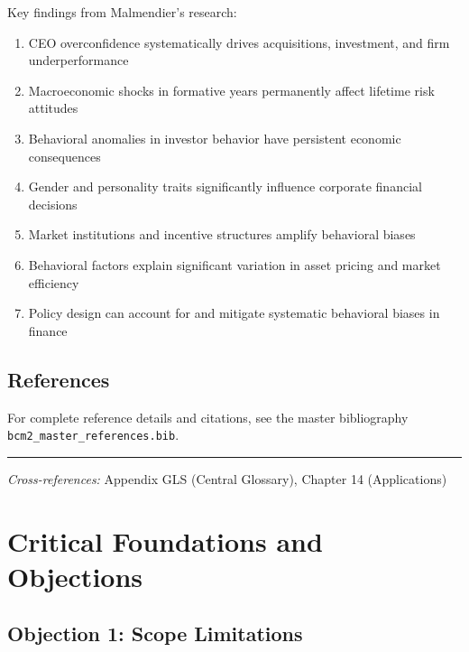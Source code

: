 Key findings from Malmendier's research:

\begin{enumerate}
  \item CEO overconfidence systematically drives acquisitions, investment, and firm underperformance
  \item Macroeconomic shocks in formative years permanently affect lifetime risk attitudes
  \item Behavioral anomalies in investor behavior have persistent economic consequences
  \item Gender and personality traits significantly influence corporate financial decisions
  \item Market institutions and incentive structures amplify behavioral biases
  \item Behavioral factors explain significant variation in asset pricing and market efficiency
  \item Policy design can account for and mitigate systematic behavioral biases in finance
\end{enumerate}

\subsection{References}

For complete reference details and citations, see the master bibliography
\texttt{bcm2\_master\_references.bib}.

\vspace{1em}
\hrule
\vspace{0.5em}

\noindent\textit{Cross-references:}
Appendix GLS (Central Glossary), Chapter 14 (Applications)



\section{Critical Foundations and Objections}
\label{sec:mal-foundations}

\subsection{Objection 1: Scope Limitations}


